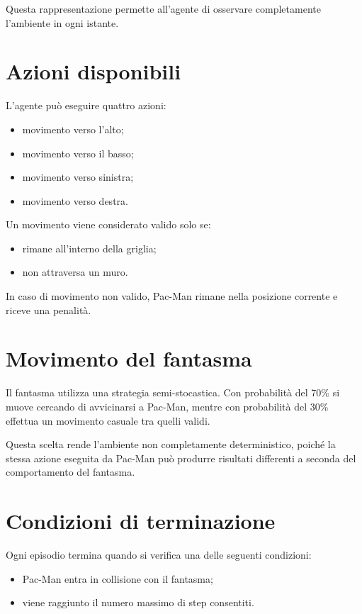 \documentclass[12pt,a4paper]{report}
\begin{document}
Questa rappresentazione permette all’agente di osservare completamente l’ambiente in ogni istante.

\section{Azioni disponibili}

L’agente può eseguire quattro azioni:

\begin{itemize}
    \item movimento verso l’alto;
    \item movimento verso il basso;
    \item movimento verso sinistra;
    \item movimento verso destra.
\end{itemize}

Un movimento viene considerato valido solo se:

\begin{itemize}
    \item rimane all’interno della griglia;
    \item non attraversa un muro.
\end{itemize}

In caso di movimento non valido, Pac-Man rimane nella posizione corrente e riceve una penalità.

\section{Movimento del fantasma}

Il fantasma utilizza una strategia semi-stocastica. Con probabilità del 70\% si muove cercando di avvicinarsi a Pac-Man, mentre con probabilità del 30\% effettua un movimento casuale tra quelli validi.

Questa scelta rende l’ambiente non completamente deterministico, poiché la stessa azione eseguita da Pac-Man può produrre risultati differenti a seconda del comportamento del fantasma.

\section{Condizioni di terminazione}

Ogni episodio termina quando si verifica una delle seguenti condizioni:

\begin{itemize}
    \item Pac-Man entra in collisione con il fantasma;
    \item viene raggiunto il numero massimo di step consentiti.
\end{itemize}
\end{document}
